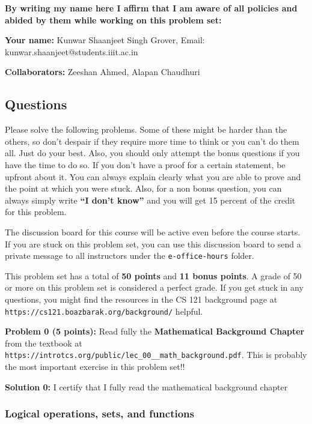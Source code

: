 \documentclass[11pt]{article}
\begin{document}
\textbf{By writing my name here I affirm that I am aware of all policies
and abided by them while working on this problem set:}

\textbf{Your name:} Kunwar Shaanjeet Singh Grover, Email: kunwar.shaanjeet@students.iiit.ac.in

\textbf{Collaborators:} Zeeshan Ahmed, Alapan Chaudhuri

\newpage


\subsection*{Questions}\label{questions}

Please solve the following problems. Some of these might be harder than
the others, so don't despair if they require more time to think or you
can't do them all. Just do your best. Also, you should only attempt the
bonus questions if you have the time to do so. If you don't have a proof
for a certain statement, be upfront about it. You can always explain
clearly what you are able to prove and the point at which you were
stuck. Also, for a non bonus question, you can always simply write
\textbf{``I don't know''} and you will get 15 percent of the credit for
this problem.

The discussion board for this course will be active even before the course
starts. If you are stuck on this problem set, you can use this discussion board to send
a private message to all instructors under the \texttt{e-office-hours}
folder.

This problem set has a total of \textbf{50 points} and \textbf{11 bonus
points}. A grade of 50 or more on this problem set is considered a
perfect grade. If you get stuck in any questions, you might find the
resources in the CS 121 background page at {\tt https://cs121.boazbarak.org/background/} helpful.

\textbf{Problem 0 (5 points):} Read fully the \textbf{Mathematical
Background Chapter} from the textbook at 
{\tt https://introtcs.org/public/lec\_00\_\_math\_background.pdf}.
This is probably the most important exercise in this problem set!!

\textbf{Solution 0:} I certify that I fully read the
mathematical background chapter


\subsubsection{Logical operations, sets, and
functions}\label{logical-operations-sets-and-functions}
\end{document}
